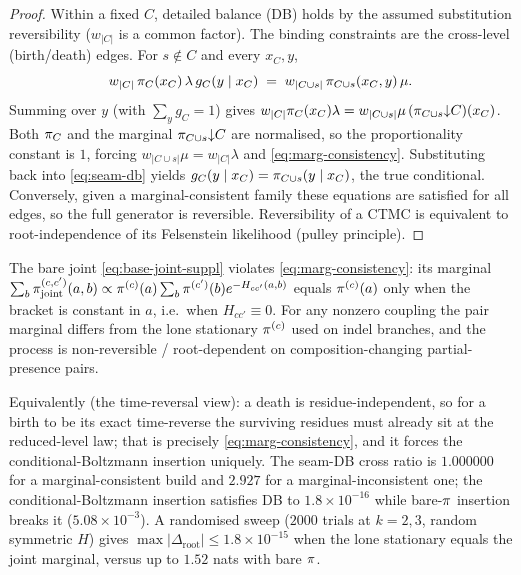 \begin{proof}
Within a fixed $C$, detailed balance (DB) holds by the assumed
substitution reversibility ($w_{|C|}$ is a common factor). The
binding constraints are the cross-level (birth/death) edges. For
$s\notin C$ and every $x_C,y$,
\begin{equation}
  w_{|C|}\,\pi_C(x_C)\,\lambda\,g_C(y\mid x_C)
  \;=\;
  w_{|C\cup s|}\,\pi_{C\cup s}(x_C,y)\,\mu .
  \label{eq:seam-db}
\end{equation}
Summing over $y$ (with $\sum_y g_C=1$) gives
$w_{|C|}\pi_C(x_C)\lambda
 = w_{|C\cup s|}\mu\,(\pi_{C\cup s}{\downarrow}C)(x_C)$.
Both $\pi_C$ and the marginal $\pi_{C\cup s}{\downarrow}C$ are
normalised, so the proportionality constant is $1$, forcing
$w_{|C\cup s|}\mu = w_{|C|}\lambda$ and
\eqref{eq:marg-consistency}. Substituting back into
\eqref{eq:seam-db} yields $g_C(y\mid x_C) = \pi_{C\cup s}(y\mid x_C)$,
the true conditional. Conversely, given a marginal-consistent
family these equations are satisfied for all edges, so the full
generator is reversible. Reversibility of a CTMC is equivalent to
root-independence of its Felsenstein likelihood (pulley principle).
\end{proof}

\begin{remark}
The bare joint \eqref{eq:base-joint-suppl} violates
\eqref{eq:marg-consistency}: its marginal
$\sum_b \pi_{\mathrm{joint}}^{(c,c')}(a,b)\propto
 \pi^{(c)}(a)\sum_b\pi^{(c')}(b)e^{-H_{cc'}(a,b)}$
equals $\pi^{(c)}(a)$ only when the bracket is constant in $a$,
i.e.\ when $H_{cc'}\equiv 0$. For any nonzero coupling the pair
marginal differs from the lone stationary $\pi^{(c)}$ used on
indel branches, and the process is non-reversible / root-dependent
on composition-changing partial-presence pairs.
\end{remark}

Equivalently (the time-reversal view): a death is residue-independent,
so for a birth to be its exact time-reverse the surviving residues
must already sit at the reduced-level law; that is precisely
\eqref{eq:marg-consistency}, and it forces the conditional-Boltzmann
insertion uniquely. The seam-DB cross ratio is $1.000000$ for a
marginal-consistent build and $2.927$ for a marginal-inconsistent
one; the conditional-Boltzmann insertion satisfies DB to
$1.8\times 10^{-16}$ while bare-$\pi$ insertion breaks it
($5.08\times 10^{-3}$). A randomised sweep ($2000$ trials at
$k=2,3$, random symmetric $H$) gives
$\max|\Delta_{\text{root}}|\le 1.8\times 10^{-15}$ when the lone
stationary equals the joint marginal, versus up to $1.52$ nats with
bare $\pi$.

